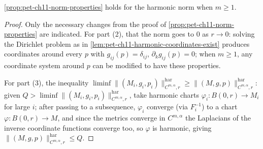 \begin{proposition}
  \label{prop:pet-ch11-harmonic-norm-properties}
  \cref{prop:pet-ch11-norm-properties} holds for the harmonic norm when
  $m\ge1$.
\end{proposition}
\begin{proof}
  Only the necessary changes from the proof of
  \cref{prop:pet-ch11-norm-properties} are indicated. For part (2), that the
  norm goes to $0$ as $r\to0$: solving the Dirichlet problem as in
  \cref{lem:pet-ch11-harmonic-coordinates-exist} produces coordinates around
  every $p$ with $g_{ij}(p)=\delta_{ij}$, $\partial_kg_{ij}(p)=0$; when
  $m\ge1$, any coordinate system around $p$ can be modified to have these
  properties.

  For part (3), the inequality
  $\liminf\|(M_i,g_i,p_i)\|^{\mathrm{har}}_{C^{m,\alpha},r}\ge\|(M,g,p)\|^{\mathrm{har}}_{C^{m,\alpha},r}$:
  given $Q>\liminf\|(M_i,g_i,p_i)\|^{\mathrm{har}}_{C^{m,\alpha},r}$, take
  harmonic charts $\varphi_i:B(0,r)\to M_i$ for large $i$; after passing to a
  subsequence, $\varphi_i$ converge (via $F_i^{-1}$) to a chart
  $\varphi:B(0,r)\to M$, and since the metrics converge in $C^{m,\alpha}$ the
  Laplacians of the inverse coordinate functions converge too, so $\varphi$
  is harmonic, giving $\|(M,g,p)\|^{\mathrm{har}}_{C^{m,\alpha},r}\le Q$.


\end{proof}
